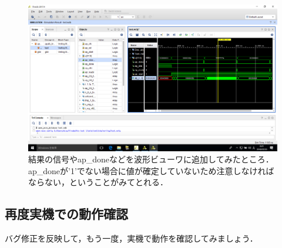 \documentclass[a4paper,dvipdfmx]{jsarticle}
\begin{document}
 \begin{figure}[H]
  \begin{center}
   \includegraphics[width=.8\textwidth]{chapter08_figures/VirtualBox_Windows10_20_03_2018_00_31_28.png}
  \end{center}
  \caption{結果の信号やap\_doneなどを波形ビューワに追加してみたところ．ap\_doneが'1'でない場合に値が確定していないため注意しなければならない，ということがみてとれる．}
 \end{figure}

 \subsection{再度実機での動作確認}
バグ修正を反映して，もう一度，実機で動作を確認してみましょう．
\end{document}
